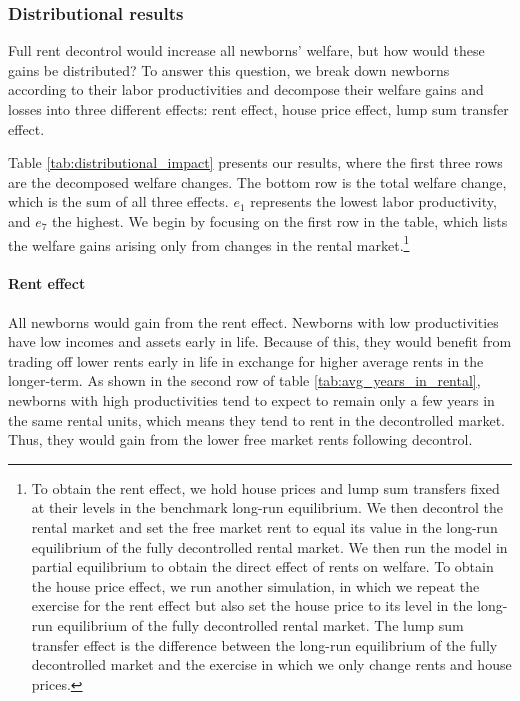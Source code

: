\documentclass[parskip=full]{article}
\begin{document}
\subsubsection{Distributional results} 

Full rent decontrol would increase all newborns' welfare, but how would these gains be distributed? To answer this question, we break down newborns according to their labor productivities and decompose their welfare gains and losses into three different effects: rent effect, house price effect, lump sum transfer effect. 

Table \ref{tab:distributional_impact} presents our results, where the first three rows are the decomposed welfare changes. The bottom row is the total welfare change, which is the sum of all three effects. $e_{1}$ represents the lowest labor productivity, and $e_{7}$ the highest. We begin by focusing on the first row in the table, which lists the welfare gains arising only from changes in the rental market.\footnote{To obtain the rent effect, we hold house prices and lump sum transfers fixed at their levels in the benchmark long-run equilibrium. We then decontrol the rental market and set the free market rent to equal its value in the long-run equilibrium of the fully decontrolled rental market. We then run the model in partial equilibrium to obtain the direct effect of rents on welfare. To obtain the house price effect, we run another simulation, in which we repeat the exercise for the rent effect but also set the house price to its level in the long-run equilibrium of the fully decontrolled rental market. The lump sum transfer effect is the difference between the long-run equilibrium of the fully decontrolled market and the exercise in which we only change rents and house prices.} 

\paragraph{Rent effect} All newborns would gain from the rent effect. Newborns with low productivities have low incomes and assets early in life. Because of this, they would benefit from trading off lower rents early in life in exchange for higher average rents in the longer-term. As shown in the second row of table \ref{tab:avg_years_in_rental}, newborns with high productivities tend to expect to remain only a few years in the same rental units, which means they tend to rent in the decontrolled market. Thus, they would gain from the lower free market rents following decontrol.
\end{document}

